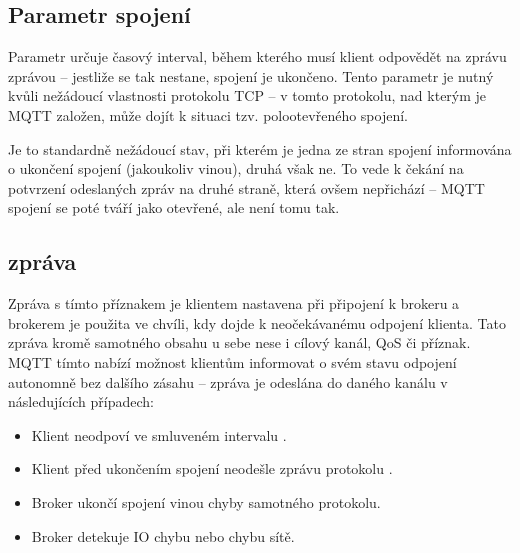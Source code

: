 \subsection{Parametr spojení }\label{subsec:parametr-spojeni-keep-alive}
Parametr  určuje časový interval, během kterého musí klient odpovědět na zprávu  zprávou
 -- jestliže se tak nestane, spojení je ukončeno.
Tento parametr je nutný kvůli nežádoucí vlastnosti protokolu TCP --
v tomto protokolu, nad kterým je MQTT založen, může dojít k situaci tzv. polootevřeného spojení.

Je to standardně nežádoucí stav, při kterém je jedna ze stran spojení informována o ukončení spojení (jakoukoliv
vinou), druhá však ne.
To vede k čekání na potvrzení odeslaných zpráv na druhé straně, která ovšem nepřichází -- MQTT spojení se poté
tváří jako otevřené, ale není tomu tak.

\subsection{ zpráva}\label{subsec:last-will-zprava}
Zpráva s tímto příznakem je klientem nastavena při připojení k brokeru a brokerem je použita ve chvíli, kdy dojde
k neočekávanému odpojení klienta.
Tato zpráva  kromě samotného obsahu u sebe nese i cílový kanál, QoS či 
příznak.
MQTT tímto nabízí možnost klientům informovat o svém stavu odpojení autonomně bez dalšího zásahu --
 zpráva je odeslána do daného kanálu v následujících případech:
\begin{itemize}
    \item Klient neodpoví ve smluveném intervalu .
    \item Klient před ukončením spojení neodešle zprávu protokolu .
    \item Broker ukončí spojení vinou chyby samotného protokolu.
    \item Broker detekuje IO chybu nebo chybu sítě.
\end{itemize}

